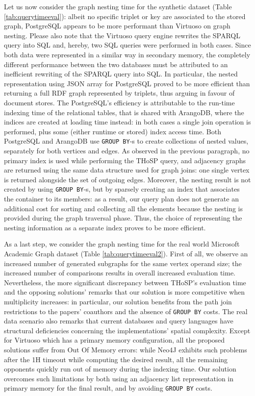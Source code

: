 Let us now consider the graph nesting time for the synthetic dataset (Table \ref{tab:querytimeeval}): albeit no specific triplet or key are associated to the stored graph, PostgreSQL appears to be more performant than Virtuoso on graph nesting. Please also note that the Virtuoso query engine rewrites the SPARQL query into SQL and, hereby, two SQL queries were performed in both cases. Since both data were represented in a similar way in secondary memory, the completely different performance between the two databases must be attributed  to an inefficient rewriting of the SPARQL query into SQL. In particular, the nested representation using JSON array for PostgreSQL proved to be more efficient than returning a full RDF graph represented by triplets, thus arguing in favour of document stores. The PostgreSQL's efficiency is attributable to the run-time indexing time of the relational tables, that is shared with ArangoDB, where the indices are created at loading time instead: in both cases a single join operation is performed, plus some (either runtime or stored) index access time. Both PostgreSQL and ArangoDB use \texttt{GROUP BY}-s to create collections of nested values, separately for both vertices and edges. As observed in the previous paragraph, no primary index is used while performing the THoSP query, and adjacency graphs are returned using the same data structure used for graph joins: one single vertex is returned alongside the set of outgoing edges. Moreover, the nesting result is not created by using \texttt{GROUP BY}-s, but by sparsely creating an index that associates the container to its members: as a result, our query plan does not generate an additional cost for sorting and collecting all the elements because the nesting is provided during the graph traversal phase. Thus, the choice of representing the nesting information as a separate index proves to be more efficient.

As a last step, we consider the graph nesting time for the real world Microsoft Academic Graph dataset (Table \ref{tab:querytimeeval2}). First of all, we observe an increased number of generated subgraphs for the same vertex operand size; the increased number of comparisons results in overall increased evaluation time. Nevertheless, the more significant discrepancy between  THoSP's evaluation time and the opposing solutions' remarks that our solution is more competitive when multiplicity increases: in particular, our solution benefits from the path join restrictions to the papers' coauthors and the absence of \texttt{GROUP BY} costs. The real data scenario also remarks that current databases and query languages have structural deficiencies concerning the implementations' spatial complexity. Except for Virtuoso which has a primary memory configuration, all the proposed solutions suffer from Out Of Memory errors: while Neo4J exhibits such problems after the 1H timeout while computing the desired result, all the remaining opponents quickly run out of memory during the indexing time. Our solution overcomes such limitations by both using an adjacency list representation in primary memory for the final result, and by avoiding \texttt{GROUP BY} costs.